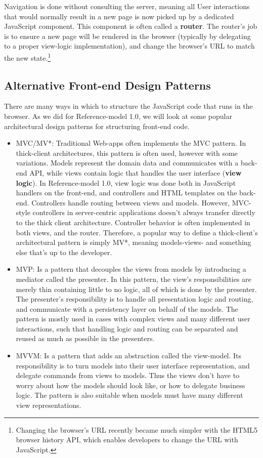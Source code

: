 Navigation is done without consulting the server, meaning all User interactions that would normally result in a new page is now picked up by a dedicated JavaScript component. This component is often called a \textbf{router}. The router's job is to ensure a new page will be rendered in the browser (typically by delegating to a proper view-logic implementation), and change the browser's URL to match the new state.\footnote{Changing the browser's URL recently became much simpler with the HTML5 browser history API\cite{html5history}, which enables developers to change the URL with JavaScript.}

\subsection{Alternative Front-end Design Patterns}
There are many ways in which to structure the JavaScript code that runs in the browser. As we did for Reference-model 1.0, we will look at some popular architectural design patterns for structuring front-end code. 
\begin{itemize}
\item{} MVC/MV*: Traditional Web-apps often implements the MVC pattern. In thick-client architectures, this pattern is often used, however with some variations.  Models represent the domain data and communicates with a back-end API, while views contain logic that handles the user interface (\textbf{view logic}). In Reference-model 1.0, view logic was done both in JavaScript handlers on the front-end, and controllers and HTML templates on the back-end. Controllers handle routing between views and models. However, MVC-style controllers in server-centric applications doesn't always transfer directly to the thick client architecture. Controller behavior is often implemented in both views, and the router. Therefore, a popular way to define a thick-client's architectural pattern is simply MV*, meaning models-views- and something else that's up to the developer. 

\item{} MVP: Is a pattern that decouples the views from models by introducing a mediator called the presenter. In this pattern, the view's responsibilities are merely thin containing little to no logic, all of which is done by the presenter. The presenter's responsibility is to handle all presentation logic and routing, and communicate with a persistency layer on behalf of the models. The pattern is mostly used in cases with complex views and many different user interactions, such that handling logic and routing can be separated and reused as much as possible in the presenters.
\item{} MVVM: Is a pattern that adds an abstraction called the view-model. Its responsibility is to turn models into their user interface representation, and delegate commands from views to models. Thus the views don't have to worry about how the models should look like, or how to delegate business logic. The pattern is also suitable when models must have many different view representations.
\end{itemize}

